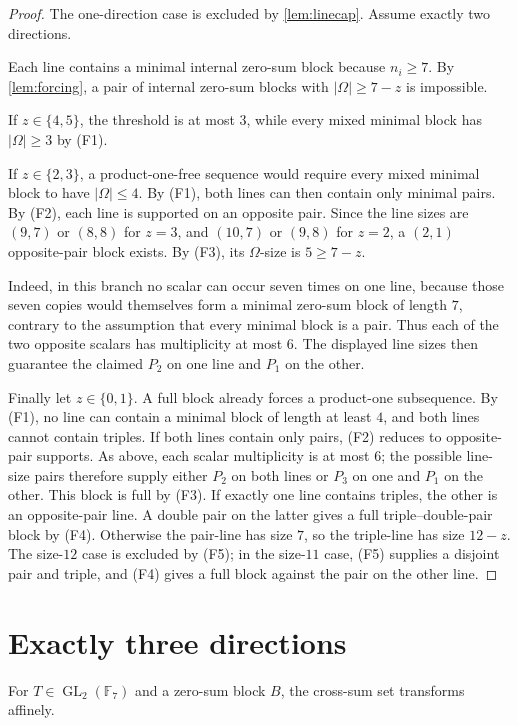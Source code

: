 \documentclass[11pt]{amsart}
\theoremstyle{definition}
\newcommand{\F}{\mathbb F}
\newcommand{\Om}{\Omega}
\begin{document}
\begin{proof}
The one-direction case is excluded by \cref{lem:linecap}. Assume exactly two directions.

Each line contains a minimal internal zero-sum block because $n_i\geq7$. By \cref{lem:forcing}, a pair of internal zero-sum blocks with $|\Om|\geq7-z$ is impossible.

If $z\in\{4,5\}$, the threshold is at most $3$, while every mixed minimal block has $|\Om|\geq3$ by (F1).

If $z\in\{2,3\}$, a product-one-free sequence would require every mixed minimal block to have $|\Om|\leq4$. By (F1), both lines can then contain only minimal pairs. By (F2), each line is supported on an opposite pair. Since the line sizes are $(9,7)$ or $(8,8)$ for $z=3$, and $(10,7)$ or $(9,8)$ for $z=2$, a $(2,1)$ opposite-pair block exists. By (F3), its $\Om$-size is $5\geq7-z$.

Indeed, in this branch no scalar can occur seven times on one line,
because those seven copies would themselves form a minimal zero-sum
block of length $7$, contrary to the assumption that every minimal
block is a pair.  Thus each of the two opposite scalars has multiplicity
at most $6$.  The displayed line sizes then guarantee the claimed
$P_2$ on one line and $P_1$ on the other.

Finally let $z\in\{0,1\}$. A full block already forces a product-one subsequence. By (F1), no line can contain a minimal block of length at least $4$, and both lines cannot contain triples. If both lines contain only pairs, (F2) reduces to opposite-pair supports.  As above, each scalar multiplicity is at most $6$; the possible line-size pairs therefore supply either $P_2$ on both lines or $P_3$ on one and $P_1$ on the other.  This block is full by (F3). If exactly one line contains triples, the other is an opposite-pair line. A double pair on the latter gives a full triple--double-pair block by (F4). Otherwise the pair-line has size $7$, so the triple-line has size $12-z$. The size-$12$ case is excluded by (F5); in the size-$11$ case, (F5) supplies a disjoint pair and triple, and (F4) gives a full block against the pair on the other line.
\end{proof}

\section{Exactly three directions}

For $T\in\operatorname{GL}_2(\F_7)$ and a zero-sum block $B$, the cross-sum set transforms affinely.
\end{document}
